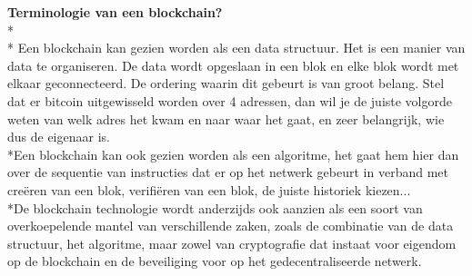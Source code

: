 \documentclass[fleqn,a4paper,12pt]{book}
\begin{document}
\textbf{Terminologie van een blockchain?}\\*\\*
Een blockchain kan gezien worden als een data structuur. Het is een manier van data te organiseren. De data wordt opgeslaan in een blok en elke blok wordt met elkaar geconnecteerd. De ordering waarin dit gebeurt is van groot belang. Stel dat er bitcoin uitgewisseld worden over 4 adressen, dan wil je de juiste volgorde weten van welk adres het kwam en naar waar het gaat, en zeer belangrijk, wie dus de eigenaar is.\\*Een blockchain kan ook gezien worden als een algoritme, het gaat hem hier dan over de sequentie van instructies dat er op het netwerk gebeurt in verband met creëren van een blok, verifiëren van een blok, de juiste historiek kiezen...\\*De blockchain technologie wordt anderzijds ook aanzien als een soort van overkoepelende mantel van verschillende zaken, zoals de combinatie van de data structuur, het algoritme, maar zowel van cryptografie dat instaat voor eigendom op de blockchain en de beveiliging voor op het gedecentraliseerde netwerk.
\end{document}
